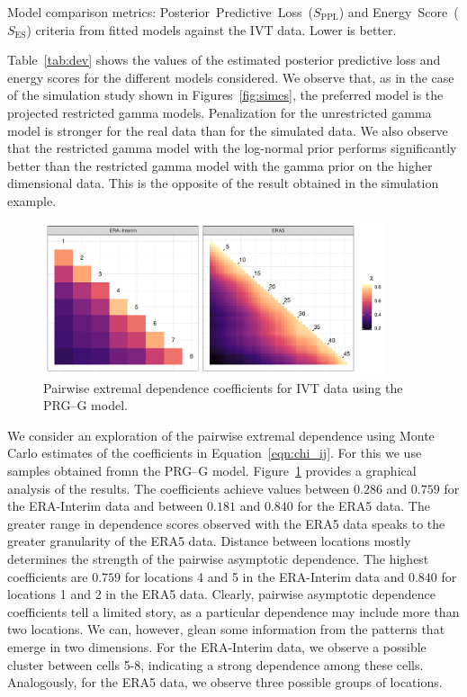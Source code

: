 \begin{table}[t]
  \centering
  \caption{Model comparison metrics: Posterior~Predictive~Loss~($S_{\text{PPL}}$) and 
    Energy~Score~($S_{\text{ES}}$) criteria from fitted models against the IVT data.  
    Lower is better. \label{tab:dev}}
  
\end{table}

Table~\ref{tab:dev} shows the values of the estimated posterior predictive loss and energy scores for the different models considered. We observe that, as in the case of the simulation study shown in Figures~\ref{fig:simes}, the preferred model is the projected restricted 
  gamma models.  Penalization for the unrestricted gamma model is 
  stronger for the real data than for the simulated data. We also observe that
  the restricted gamma model with the log-normal prior performs significantly better 
  than the restricted gamma model with the gamma prior on the higher dimensional data. This is the opposite of the result obtained in the simulation example.

\begin{figure}[ht]
    \centering
    \caption{Pairwise extremal dependence coefficients for IVT data using the PRG--G model.\label{fig:chi_ij}}
    \includegraphics[width=0.9\textwidth]{./images/chi_ij_c}
\end{figure}

We consider an exploration of the pairwise extremal dependence using Monte Carlo estimates of the 
  coefficients in  Equation~\ref{eqn:chi_ij}. For this we use samples obtained fromn the PRG--G model.
  Figure~\ref{fig:chi_ij} provides a graphical analysis of the results. 
  The coefficients achieve values between $0.286$ and $0.759$ for the ERA-Interim data and 
  between $0.181$ and $0.840$ for the ERA5 data.  The greater range in dependence scores observed 
  with the ERA5 data speaks to the greater granularity of the ERA5 data. Distance between locations 
  mostly determines the strength of the pairwise asymptotic dependence. The highest coefficients 
  are $0.759$ for locations 4 and 5 in the ERA-Interim data and
  $0.840$ for locations 1 and 2 in the ERA5 data.  Clearly, pairwise asymptotic
  dependence coefficients tell a limited story, as a particular dependence may include
  more than two locations.   We can, however, glean some information from the patterns that emerge in
  two dimensions.  For the ERA-Interim data, we observe a possible cluster between cells 5-8, indicating a
  strong dependence among these cells.  Analogously, for the ERA5 data, we observe three possible groups  of locations.

